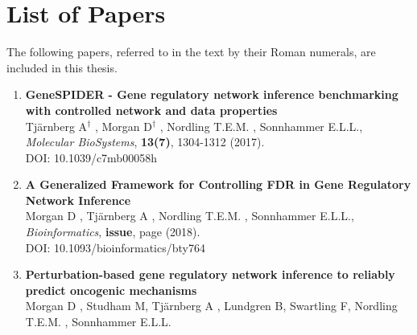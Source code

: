 \chapter{List of Papers}

\vspace{-5pt} %

The following papers, referred to in the text by their Roman numerals, are included in this thesis.

\vspace{0pt} %


\begin{enumerate}[P{A}PER I: ]

\setlength{\itemsep}{3.3mm} %



\item\textbf{GeneSPIDER - Gene regulatory network inference benchmarking with controlled network and data properties}\\
Tj{\"a}rnberg A\textit{$^{\dagger}$} , Morgan D\textit{$^{\dagger}$} ,  Nordling T.E.M. , Sonnhammer E.L.L., \emph{Molecular BioSystems}, \textbf{13(7)}, 1304-1312 (2017).\\
DOI: 10.1039/c7mb00058h{} 

\item\textbf{A Generalized Framework for Controlling FDR in Gene Regulatory Network Inference}\\
Morgan D , Tj{\"a}rnberg A , Nordling T.E.M. , Sonnhammer E.L.L., \emph{Bioinformatics}, \textbf{issue}, page (2018).\\
DOI: 10.1093/bioinformatics/bty764{} 

\item\textbf{Perturbation-based gene regulatory network inference to reliably predict oncogenic mechanisms}\\
Morgan D , Studham M, Tj{\"a}rnberg A , Lundgren B, Swartling F, Nordling T.E.M. , Sonnhammer E.L.L.


\end{enumerate}
